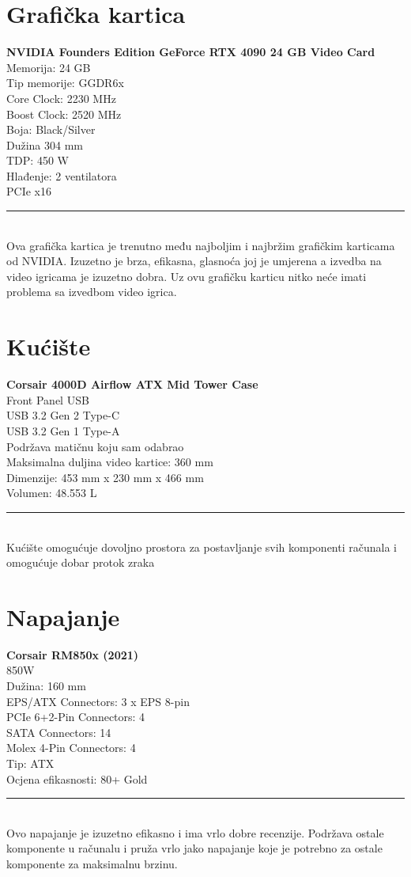 \documentclass{article}
\begin{document}
\section{Grafička kartica}
\textbf{NVIDIA Founders Edition GeForce RTX 4090 24 GB Video Card}
\\ Memorija: 24 GB
\\ Tip memorije: GGDR6x
\\ Core Clock: 2230 MHz
\\ Boost Clock: 2520 MHz
\\ Boja: Black/Silver
\\ Dužina 304 mm
\\ TDP: 450 W
\\ Hlađenje: 2 ventilatora
\\ PCIe x16
\\ \rule{\textwidth}{0.5pt}
\\ Ova grafička kartica je trenutno među najboljim i najbržim grafičkim karticama od NVIDIA. Izuzetno je brza, efikasna, glasnoća joj je umjerena a izvedba na video igricama je izuzetno dobra. Uz ovu grafičku karticu nitko neće imati problema sa izvedbom video igrica.

\section{Kućište}
\textbf{Corsair 4000D Airflow ATX Mid Tower Case}
\\ Front Panel USB
\\ USB 3.2 Gen 2 Type-C
\\ USB 3.2 Gen 1 Type-A
\\ Podržava matičnu koju sam odabrao
\\ Maksimalna duljina video kartice: 360 mm
\\ Dimenzije: 453 mm x 230 mm x 466 mm
\\ Volumen: 48.553 L
\\ \rule{\textwidth}{0.5pt}
\\ Kućište omogućuje dovoljno prostora za postavljanje svih komponenti računala i omogućuje dobar protok zraka

\section{Napajanje}
\textbf{Corsair RM850x (2021)}
\\ 850W
\\ Dužina: 160 mm
\\ EPS/ATX Connectors: 3 x EPS 8-pin
\\ PCIe 6+2-Pin Connectors: 4
\\ SATA Connectors: 14
\\ Molex 4-Pin Connectors: 4
\\ Tip: ATX
\\ Ocjena efikasnosti: 80+ Gold
\\ \rule{\textwidth}{0.5pt}
\\ Ovo napajanje je izuzetno efikasno i ima vrlo dobre recenzije. Podržava ostale komponente u računalu i pruža vrlo jako napajanje koje je potrebno za ostale komponente za maksimalnu brzinu.
\end{document}
